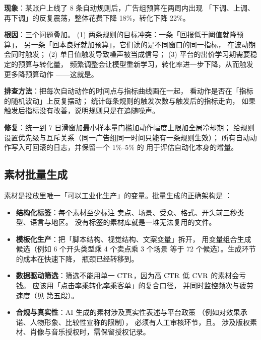 \begin{pitfall}[自动化规则的正反馈与震荡]
\textbf{现象}：某账户上线了 8 条自动规则后，广告组预算在两周内出现
「下调、上调、再下调」的反复震荡，整体花费下降 18\%，转化下降 22\%。

\textbf{根因}：三个问题叠加。
(1) 两条规则的目标冲突：一条「回报低于阈值就降预算」，
另一条「回本良好就加预算」，它们读的是不同窗口的同一指标，
在波动期会同时触发；
(2) 单日值触发导致噪声被当成信号；
(3) 平台的出价学习期需要稳定的预算与转化量，
频繁调整会让模型重新学习，转化率进一步下降，从而触发更多降预算动作
——这就是。

\textbf{排查方法}：把每次自动动作的时间点与指标曲线画在一起，
看动作是否在「指标的随机波动」上反复摆动；
统计每条规则的触发次数与触发后的指标走向，
如果触发后指标没有改善，说明规则只是在追随噪声。

\textbf{修复}：统一到 7 日滑窗加最小样本量门槛加动作幅度上限加全局冷却期；
给规则设置优先级与互斥关系（同一广告组同一时间只能有一条规则生效）；
所有自动动作写入可回滚的日志，并保留一个 1\%--5\% 的
用于评估自动化本身的增量。
\end{pitfall}

\subsection{素材批量生成}

素材是投放里唯一「可以工业化生产」的变量。批量生成的正确架构是
：

\begin{itemize}
  \item \textbf{结构化标签}：每个素材至少标注
        卖点、场景、受众、格式、开头前三秒类型、语言与地区。
        没有标签的素材库就是一堆无法复用的文件。
  \item \textbf{模板化生产}：把「脚本结构、视觉结构、文案变量」拆开，
        用变量组合生成候选（例如 6 个开头类型乘 4 个卖点乘 3 个场景
        等于 72 个候选）。生成环节的成本在快速下降，
        瓶颈已经转移到。
  \item \textbf{数据驱动筛选}：筛选不能用单一 $\operatorname{CTR}$，因为高 $\operatorname{CTR}$ 低 $\operatorname{CVR}$ 的素材会亏钱。
        应该用「点击率乘转化率乘客单」的复合口径，
        并同时监控频次与疲劳速度（见  第五段）。
  \item \textbf{合规与真实性}：AI 生成的素材涉及真实性表述与平台政策
        （例如对效果承诺、人物形象、比较性宣称的限制），
        必须有人工审核环节，且。
        涉及版权素材、肖像与音乐授权时，需保留授权记录。
\end{itemize}

